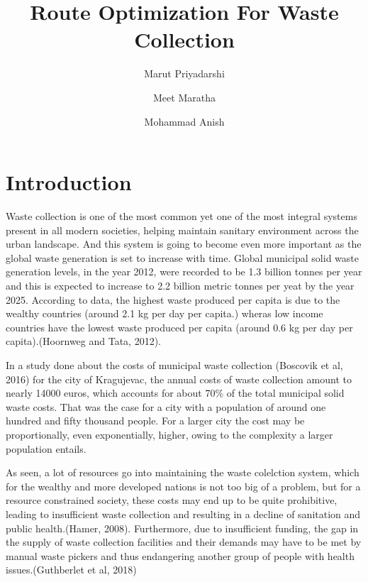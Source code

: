 \documentclass[12pt]{article}
\begin{document}

\title{Route Optimization For Waste Collection\\}

\author[1]{Marut Priyadarshi}
\author[2]{Meet Maratha}
\author[3]{Mohammad Anish}

\maketitle

\section{Introduction}
Waste collection is one of the most common yet one of the most integral systems present in all modern societies, helping maintain sanitary environment across the urban landscape. And this system is going to become even more important as the global waste generation is set to increase with time. Global municipal solid waste generation levels, in the year 2012, were recorded to be 1.3 billion tonnes per year and this is expected to increase to 2.2 billion metric tonnes per yeat by the year 2025. According to data, the highest waste produced per capita is due to the wealthy countries (around 2.1 kg per day per capita.) wheras low income countries have the lowest waste produced per capita (around 0.6 kg per day per capita).(Hoornweg and Tata, 2012).

In a study done about the costs of municipal waste collection (Boscovik et al, 2016) for the city of Kragujevac, the annual costs of waste collection amount to nearly 14000 euros, which accounts for about 70\% of the total municipal solid waste costs. That was the case for a city with a population of around one hundred and fifty thousand people. For a larger city the cost may be proportionally, even exponentially, higher, owing to the complexity a larger population entails.

As seen, a lot of resources go into maintaining the waste colelction system, which for the wealthy and more developed nations is not too big of a problem, but for a resource constrained society, these costs may end up to be quite prohibitive, leading to insufficient waste collection and resulting in a decline of sanitation and public health.(Hamer, 2008). Furthermore, due to insufficient funding, the gap in the supply of waste collection facilities and their demands may have to be met by manual waste pickers and thus endangering another group of people with health issues.(Guthberlet et al, 2018)
\end{document}
